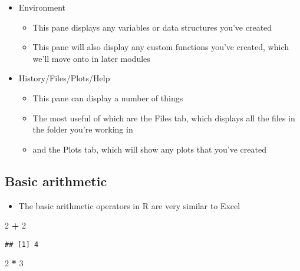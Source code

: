 \documentclass[]{article}
\newenvironment{Shaded}{\begin{snugshade}}{\end{snugshade}}
\newcommand{\DecValTok}[1]{\textcolor[rgb]{0.00,0.00,0.81}{#1}}
\newcommand{\StringTok}[1]{\textcolor[rgb]{0.31,0.60,0.02}{#1}}
\newcommand{\OperatorTok}[1]{\textcolor[rgb]{0.81,0.36,0.00}{\textbf{#1}}}
\providecommand{\tightlist}{%
  \setlength{\itemsep}{0pt}\setlength{\parskip}{0pt}}
\begin{document}
\begin{itemize}
\tightlist
\item
  Environment

  \begin{itemize}
  \tightlist
  \item
    This pane displays any variables or data structures you've created
  \item
    This pane will also display any custom functions you've created,
    which we'll move onto in later modules
  \end{itemize}
\item
  History/Files/Plots/Help

  \begin{itemize}
  \tightlist
  \item
    This pane can display a number of things
  \item
    The most useful of which are the Files tab, which displays all the
    files in the folder you're working in
  \item
    and the Plots tab, which will show any plots that you've created
  \end{itemize}
\end{itemize}

\subsection{Basic arithmetic}\label{basic-arithmetic}

\begin{itemize}
\tightlist
\item
  The basic arithmetic operators in R are very similar to Excel
\end{itemize}

\begin{Shaded}
\begin{Highlighting}[]
\DecValTok{2} \OperatorTok{+}\StringTok{ }\DecValTok{2}
\end{Highlighting}
\end{Shaded}

\begin{verbatim}
## [1] 4
\end{verbatim}

\begin{Shaded}
\begin{Highlighting}[]
\DecValTok{2} \OperatorTok{*}\StringTok{ }\DecValTok{3}
\end{Highlighting}
\end{Shaded}
\end{document}
